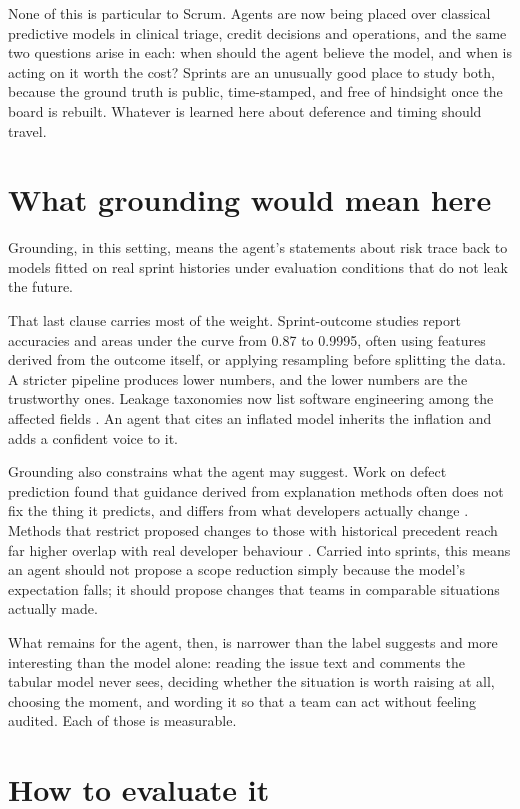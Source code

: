 \documentclass[conference]{IEEEtran}
\begin{document}
None of this is particular to Scrum. Agents are now being placed over classical predictive models in clinical triage, credit decisions and operations, and the same two questions arise in each: when should the agent believe the model, and when is acting on it worth the cost? Sprints are an unusually good place to study both, because the ground truth is public, time-stamped, and free of hindsight once the board is rebuilt. Whatever is learned here about deference and timing should travel.

\section{What grounding would mean here}
\label{sec:grounding}

Grounding, in this setting, means the agent's statements about risk trace back to models fitted on real sprint histories under evaluation conditions that do not leak the future.

That last clause carries most of the weight. Sprint-outcome studies report accuracies and areas under the curve from 0.87 to 0.9995, often using features derived from the outcome itself, or applying resampling before splitting the data. A stricter pipeline produces lower numbers, and the lower numbers are the trustworthy ones. Leakage taxonomies now list software engineering among the affected fields \cite{leakage}. An agent that cites an inflated model inherits the inflation and adds a confident voice to it.

Grounding also constrains what the agent may suggest. Work on defect prediction found that guidance derived from explanation methods often does not fix the thing it predicts, and differs from what developers actually change \cite{saner}. Methods that restrict proposed changes to those with historical precedent reach far higher overlap with real developer behaviour \cite{counteract}. Carried into sprints, this means an agent should not propose a scope reduction simply because the model's expectation falls; it should propose changes that teams in comparable situations actually made.

What remains for the agent, then, is narrower than the label suggests and more interesting than the model alone: reading the issue text and comments the tabular model never sees, deciding whether the situation is worth raising at all, choosing the moment, and wording it so that a team can act without feeling audited. Each of those is measurable.

\section{How to evaluate it}
\label{sec:eval}
\end{document}
